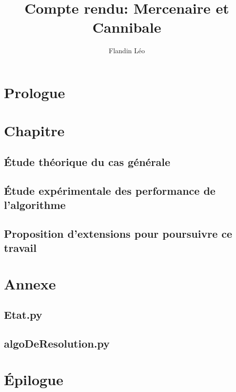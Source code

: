\documentclass[a4paper, 12pt, french]{book}
\title{Compte rendu: Mercenaire et Cannibale}
\author{Flandin Léo}
\begin{document}
\maketitle
\tableofcontents
\frontmatter
\chapter{Prologue}

\mainmatter
\chapter{Chapitre}
\section{Étude théorique du cas générale}
\section{Étude expérimentale des performance de l'algorithme}
\section{Proposition d'extensions pour poursuivre ce travail }

\appendix
\chapter{Annexe}
\section{Etat.py}
\section{algoDeResolution.py}

\backmatter
\chapter{Épilogue}
\end{document}
